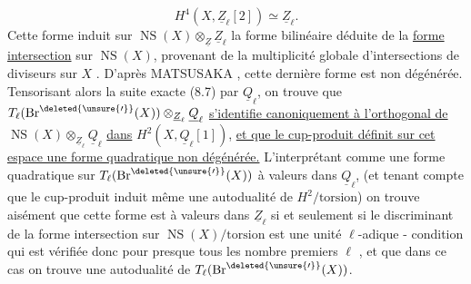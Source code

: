 \[
H^4(X,\underline Z_{\ell}[2])\simeq\underline Z_{\ell}.
\]
 Cette forme induit sur $\operatorname{NS}(X)\otimes_{\underline Z}\underline Z_{\ell}$ la forme bilinéaire déduite de la \uline{forme intersection} sur $\operatorname{NS}(X)$, provenant de la multiplicité
\margin{$\times$}
globale d'intersections de diviseurs sur $X$ \inserted{[15]} . D'après
\margin{$\times$}
MATSUSAKA \inserted{[27]}, cette dernière forme est non dégénérée. Tensorisant alors la suite exacte (8.7) par $\underline Q_{\ell}$, on trouve que $T_{\ell}(\operatorname{Br}^{\deleted{\unsure{\prime}}}(X))\otimes_{\underline Z_{\ell}}\underline Q_{\ell}$ \uline{s'identifie canoniquement à l'orthogonal de} $\operatorname{NS}(X)\otimes_{\underline Z_{\ell}}\underline Q_{\ell}$ \uline{dans} $H^2(X,\underline Q_{\ell}[1])$, \uline{et que le cup-produit définit sur cet espace une forme quadratique non dégénérée.}
L'interprétant comme une forme quadratique sur $T_{\ell}(\operatorname{Br}^{\deleted{\unsure{\prime}}}(X))$ à valeurs dans $\underline Q_{\ell}$, (et tenant compte que le cup-produit induit même une autodualité de $H^2/\mathrm{torsion}$) on trouve aisément que cette forme est à valeurs dans $\underline Z_{\ell}$ si et seulement si le discriminant de la forme intersection sur $\operatorname{NS}(X)/\mathrm{torsion}$ est une unité $\ell$-adique - condition qui est vérifiée donc pour presque tous les nombre premiers $\ell$ \deleted{\unsure{-}}, et que dans ce cas on trouve une autodualité de $T_{\ell}(\operatorname{Br}^{\deleted{\unsure{\prime}}}(X))$.


